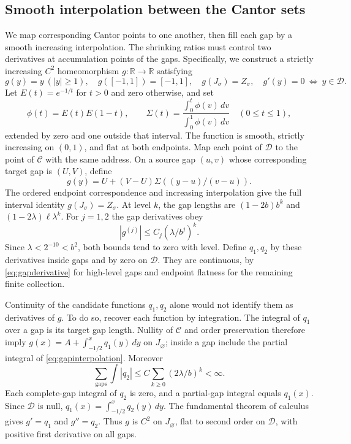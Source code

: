 \documentclass[11pt]{amsart}
\theoremstyle{definition}
\theoremstyle{remark}
\newcommand{\R}{\mathbb R}
\numberwithin{equation}{section}
\begin{document}
\subsection{Smooth interpolation between the Cantor sets}
We map corresponding Cantor points to one another, then fill each
gap by a smooth increasing interpolation. The shrinking ratios
must control two derivatives at accumulation points of the gaps.
Specifically, we construct a strictly increasing $C^2$ homeomorphism
$g:\R\to\R$ satisfying
\begin{equation}\label{eq:flatmapproperties}
g(y)=y\ (|y|\ge1),\quad g([-1,1])=[-1,1],\quad
g(J_\sigma)=Z_\sigma,\quad g'(y)=0\ \Longleftrightarrow\ y\in\mathcal D.
\end{equation}
Let $E(t)=e^{-1/t}$ for $t>0$ and zero otherwise, and set
\[
\phi(t)=E(t)E(1-t),\qquad
\Sigma(t)=\frac{\int_0^t\phi(v)\,dv}{\int_0^1\phi(v)\,dv}
\quad(0\le t\le1),
\]
extended by zero and one outside that interval. The function is smooth,
strictly increasing on $(0,1)$, and flat at both endpoints.
Map each point of $\mathcal D$ to the point of $\mathcal C$ with
the same address. On a source gap $(u,v)$ whose corresponding
target gap is $(U,V)$, define
\begin{equation}\label{eq:gapinterpolation}
g(y)=U+(V-U)\Sigma((y-u)/(v-u)).
\end{equation}
The ordered endpoint correspondence and increasing interpolation
give the full interval identity $g(J_\sigma)=Z_\sigma$.
At level $k$, the gap lengths are $(1-2b)b^k$ and
$(1-2\lambda)\ell\lambda^k$. For $j=1,2$ the gap derivatives obey
\begin{equation}\label{eq:gapderivative}
|g^{(j)}|\le C_j(\lambda/b^j)^k.
\end{equation}
Since $\lambda<2^{-10}<b^2$, both bounds tend to zero with level.
Define $q_1,q_2$ by these derivatives inside gaps and by zero on
$\mathcal D$. They are continuous, by \eqref{eq:gapderivative}
for high-level gaps and endpoint flatness for the remaining finite
collection.

Continuity of the candidate functions $q_1,q_2$ alone would not
identify them as derivatives of $g$. To do so, recover each function
by integration. The integral of
$q_1$ over a gap is its target gap length. Nullity of $\mathcal C$
and order preservation therefore imply
$g(x)=A+\int_{-1/2}^xq_1(y)\,dy$ on $J_\varnothing$; inside a gap include
the partial integral of \eqref{eq:gapinterpolation}.
Moreover
\[
\sum_{\text{gaps}}\int|q_2|
                  \le C\sum_{k\ge0}(2\lambda/b)^k<\infty.
\]
Each complete-gap integral of $q_2$ is zero, and a partial-gap
integral equals $q_1(x)$. Since $\mathcal D$ is null,
$q_1(x)=\int_{-1/2}^xq_2(y)\,dy$. The fundamental theorem of
calculus gives $g'=q_1$ and $g''=q_2$. Thus $g$ is $C^2$
on $J_\varnothing$, flat to second order on $\mathcal D$, with positive
first derivative on all gaps.
\end{document}
